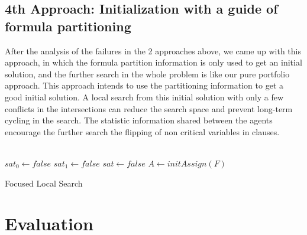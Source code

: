 \documentclass[12pt,a4paper,twoside]{scrartcl}
\numberwithin{equation}{section}
\begin{document}
\subsection{4th Approach: Initialization with a guide of formula partitioning}
After the analysis of the failures in the 2 approaches above, we came up with this approach, in which the formula partition information is only used to get an initial solution, and the further search in the whole problem is like our pure portfolio approach. This approach intends to use the partitioning information to get a good initial solution.  A local search from this initial solution with only a few conflicts in the intersections can reduce the search space and prevent long-term cycling in the search. The statistic information shared between the agents encourage the further search the flipping of non critical variables in clauses. \\
\\
\begin{algorithm}[H]
  $sat_0 \leftarrow false$\;
  $sat_1 \leftarrow false$\;
  $sat \leftarrow false$\;
  $A \leftarrow initAssign(F)$\;
 \caption{Focused Local Search}
\end{algorithm}  



\clearpage
\section{Evaluation} 
\label{sec:eva}
\end{document}
